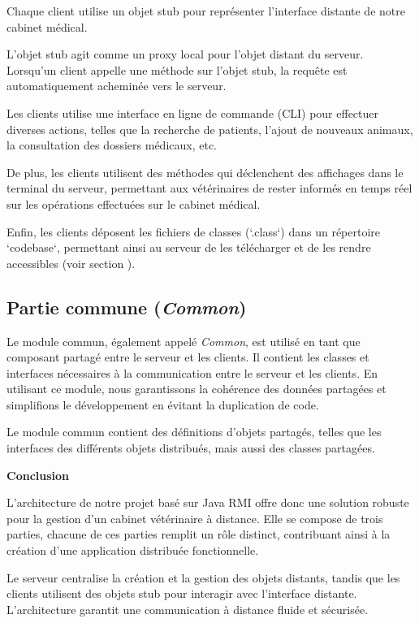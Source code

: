 \documentclass{article} %
\begin{document}
Chaque client utilise un objet stub pour représenter l'interface distante de notre cabinet médical.

L'objet stub agit comme un proxy local pour l'objet distant du serveur.
Lorsqu'un client appelle une méthode sur l'objet stub, la requête est automatiquement acheminée vers le serveur.

Les clients utilise une interface en ligne de commande (CLI) pour effectuer diverses actions,
telles que la recherche de patients, l'ajout de nouveaux animaux, la consultation des dossiers médicaux,
etc.

De plus, les clients utilisent des méthodes qui déclenchent des affichages dans le terminal du serveur,
permettant aux vétérinaires de rester informés en temps réel sur les opérations effectuées sur le cabinet médical.

Enfin, les clients déposent les fichiers de classes (`.class`) dans un répertoire `codebase`,
permettant ainsi au serveur de les télécharger et de les rendre accessibles (voir section ).

\subsection{Partie commune (\textit{Common})}

Le module commun, également appelé \textit{Common}, est utilisé en tant que
composant partagé entre le serveur et les clients.
Il contient les classes et interfaces nécessaires à la communication entre le serveur et les clients.
En utilisant ce module, nous garantissons la cohérence des données partagées et
simplifions le développement en évitant la duplication de code.

Le module commun contient des définitions d'objets partagés, telles que les interfaces des différents
objets distribués, mais aussi des classes partagées.

\bigskip
\textbf{Conclusion}
\bigskip

L'architecture de notre projet basé sur Java RMI offre donc une solution robuste
pour la gestion d'un cabinet vétérinaire à distance.
Elle se compose de trois parties, chacune de ces parties remplit un rôle distinct,
contribuant ainsi à la création d'une application distribuée fonctionnelle.

Le serveur centralise la création et la gestion des objets distants,
tandis que les clients utilisent des objets stub pour interagir avec l'interface distante.
L'architecture garantit une communication à distance fluide et sécurisée.
\end{document}

